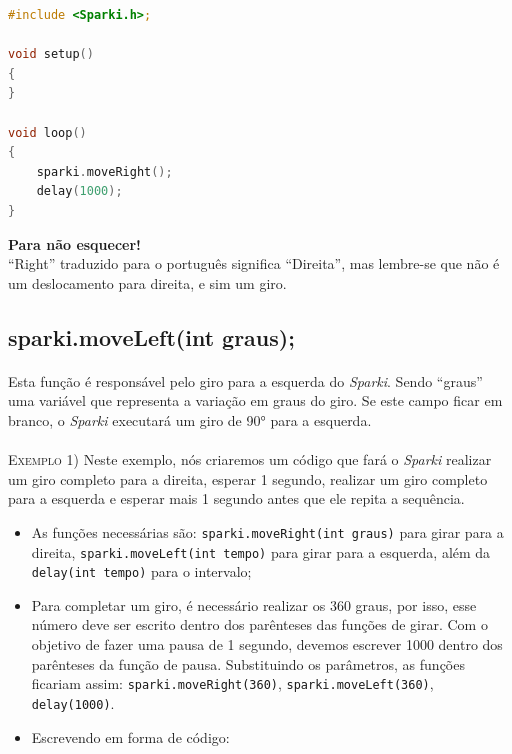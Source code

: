     \begin{lstlisting}[language=C]
#include <Sparki.h>;

void setup()
{
}

void loop()
{
    sparki.moveRight();
    delay(1000);
}
\end{lstlisting}
    
    \begin{center}
    \textcolor{mydarkblue}{\textbf{Para não esquecer!}}
    \\``Right'' traduzido para o português significa ``Direita'', mas lembre-se que não é um deslocamento para direita, e sim um giro.
    \end{center}
    
\subsection{sparki.moveLeft(int graus);}
    \paragraph{}
    Esta função é responsável pelo giro para a esquerda do \textsl{Sparki}. Sendo ``graus'' uma variável que representa a variação em graus do giro. Se este campo ficar em branco, o \textsl{Sparki} executará um giro de 90° para a esquerda.
    \\~\\
    \textsc{Exemplo 1)} Neste exemplo, nós criaremos um código que fará o \textsl{Sparki} realizar um giro completo para a direita, esperar 1 segundo, realizar um giro completo para a esquerda e esperar mais 1 segundo antes que ele repita a sequência.
    
    \begin{itemize}
        \item As funções necessárias são: \lstinline[columns=fixed]{sparki.moveRight(int graus)} para girar para a direita, \lstinline[columns=fixed]{sparki.moveLeft(int tempo)} para girar para a esquerda, além da \lstinline[columns=fixed]{delay(int tempo)} para o intervalo;
        \item Para completar um giro, é necessário realizar os 360 graus, por isso, esse número deve ser escrito dentro dos parênteses das funções de girar. Com o objetivo de fazer uma pausa de 1 segundo, devemos escrever 1000 dentro dos parênteses da função de pausa. Substituindo os parâmetros, as funções ficariam assim: \lstinline[columns=fixed]{sparki.moveRight(360)}, \lstinline[columns=fixed]{sparki.moveLeft(360)}, \lstinline[columns=fixed]{delay(1000)}.
        \item Escrevendo em forma de código:
    \end{itemize}
    
